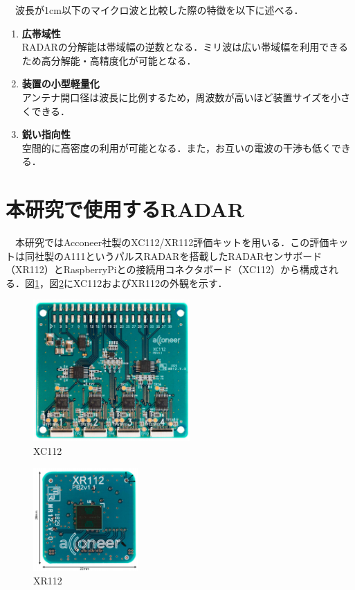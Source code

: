 　波長が1cm以下のマイクロ波と比較した際の特徴を以下に述べる\cite{feature_RadioWaves}．
\begin{enumerate}
    \item \textbf{広帯域性}\\
        RADARの分解能は帯域幅の逆数となる．ミリ波は広い帯域幅を利用できるため高分解能・高精度化が可能となる．
    \item \textbf{装置の小型軽量化}\\
        アンテナ開口径は波長に比例するため，周波数が高いほど装置サイズを小さくできる．
    \item \textbf{鋭い指向性}\\
        空間的に高密度の利用が可能となる．また，お互いの電波の干渉も低くできる．
\end{enumerate}

\section{本研究で使用するRADAR}
　本研究ではAcconeer社製のXC112/XR112評価キットを用いる．この評価キットは同社製のA111というパルスRADARを搭載したRADARセンサボード（XR112）とRaspberryPiとの接続用コネクタボード（XC112）から構成される．図\ref{fig:XC112}，図\ref{fig:XR112}にXC112およびXR112の外観を示す．
\begin{figure}[H]
    \centering
    \includegraphics[width=6cm]{./fig/XC112.png}
    \caption{XC112\cite{XC112ProductBrief}}
    \label{fig:XC112}
\end{figure}

\begin{figure}[H]
    \centering
    \includegraphics[width=4cm]{./fig/XR112.png}
    \caption{XR112\cite{XR112ProductBrief}}
    \label{fig:XR112}
\end{figure}

